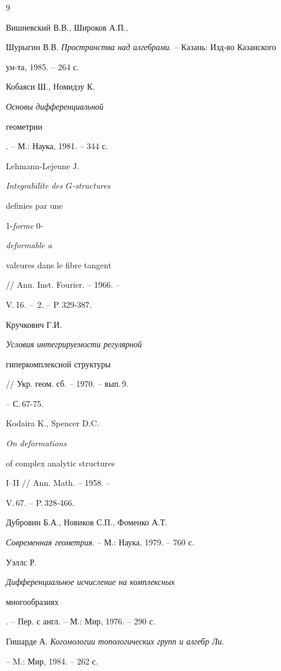 \begin{thebibliography}{9}







Вишневский В.В., Широков А.П.,


Шурыгин В.В. {\em Пространства над алгебрами}. -- Казань: Изд-во Казанского


ун-та, 1985. -- 264 с.







Кобаяси Ш., Номидзу К. {\em Основы дифференциальной


геометрии}. -- М.: Наука, 1981. -- 344 с.







Lehmann-Lejeune J. {\em Integrabilite des $G$-structures


definies par une} 1-{\em forme} 0-{\em deformable a


valeures dans le fibre tangent} // Ann. Inst. Fourier. -- 1966. --


V.\,16. -- \No\,2. -- P.\,329-387.







Кручкович Г.И. {\em Условия интегрируемости регулярной


гиперкомплексной структуры} // Укр. геом. сб. -- 1970. -- вып.\,9.


-- С.\,67-75.







Kodaira K., Spencer D.C. {\em On deformations


of complex analytic structures} I--II // Ann. Math. -- 1958. --


V.\,67. -- P.\,328-466.







Дубровин Б.А., Новиков С.П., Фоменко А.Т.


{\em Современная геометрия}. -- М.: Наука, 1979. -- 760 с.







Уэллс Р. {\em Дифференциальное исчисление на комплексных


многообразиях}. -- Пер. с англ. -- М.: Мир, 1976. -- 290 с.







Гишарде А. {\em Когомологии топологических групп и алгебр Ли}.


-- M.: Мир, 1984. -- 262 с.





\end{thebibliography} 


